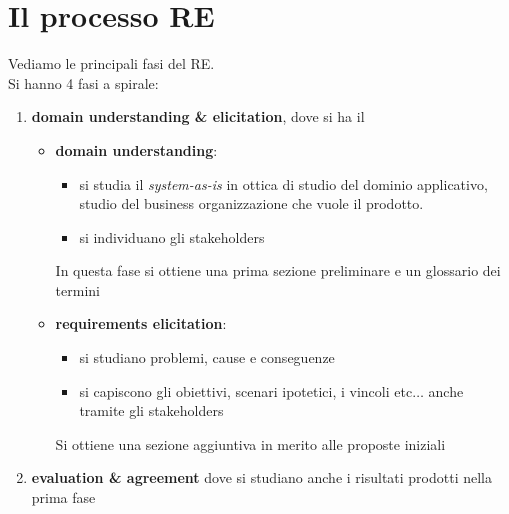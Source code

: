 \documentclass[a4paper,12pt, oneside]{book}
\begin{document}
\section{Il processo RE}
Vediamo le principali fasi del RE.\\
Si hanno 4 fasi a spirale:
\begin{enumerate}
  \item \textbf{domain understanding \& elicitation}, dove si ha il
  \begin{itemize}
    \item \textbf{domain understanding}:
    \begin{itemize}
      \item si studia il \textit{system-as-is} in ottica di studio del dominio
      applicativo, studio del business organizzazione che vuole il prodotto.
      \item si individuano gli stakeholders
    \end{itemize}
    In questa fase si ottiene una prima sezione preliminare e un glossario dei
    termini
    
    \item \textbf{requirements elicitation}:
    \begin{itemize}
      \item si studiano problemi, cause e conseguenze
      \item si capiscono gli obiettivi, scenari ipotetici, i vincoli etc$\ldots$
      anche tramite gli stakeholders
    \end{itemize}
    Si ottiene una sezione aggiuntiva in merito alle proposte iniziali
  \end{itemize}
  
  \item \textbf{evaluation \& agreement} dove si studiano anche i risultati
  prodotti nella prima fase
\end{enumerate}
\end{document}
